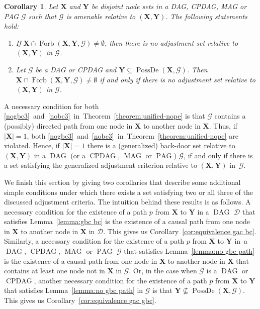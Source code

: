 \documentclass[11pt,a4paper]{article}
\newtheorem{corollary}[definition]{Corollary}
\DeclareMathOperator{\CPDAG}{CPDAG}
\DeclareMathOperator{\DAG}{DAG}
\DeclareMathOperator{\MAG}{MAG}
\DeclareMathOperator{\PAG}{PAG}
\DeclareMathOperator{\PossDe}{PossDe}
\DeclareMathOperator{\Forbi}{Forb}
\newcommand{\g}[1][G]{\mathcal{#1}}
\newcommand{\fb}[2][X,Y]{\Forbi(\mathbf{#1},#2)}%
\begin{document}
\begin{corollary}
Let $\mathbf{X}$ and $\mathbf{Y}$ be disjoint node sets in a DAG, CPDAG, MAG or PAG $\g$ such that $\g$ is amenable relative to $(\mathbf{X,Y})$. The following statements hold:
\begin{enumerate}[label=(\roman*)]
\item\label{noforbx1}  If $\mathbf{X} \cap \fb{\g} \neq \emptyset$, then there is no adjustment set relative to $(\mathbf{X,Y})$ in $\g$.
\item\label{noforbx2} Let $\g$ be a DAG or CPDAG and $\mathbf{Y} \subseteq \PossDe(\mathbf{X},\g)$. Then $\mathbf{X} \cap \fb{\g} \neq \emptyset$ if and only if there is no adjustment set relative to $(\mathbf{X,Y})$ in $\g$.
\end{enumerate}
\label{cor:noforbx}
\end{corollary}


\noindent{}A necessary condition for both \ref{nogbc3}~and~\ref{nobc3}~in~Theorem~\ref{theorem:unified-nope} is that $\g$ contains a (possibly) directed path from one node in $\mathbf{X}$ to another node in $\mathbf{X}$. Thus, if $|\mathbf{X}|=1$, both \ref{nogbc3}~and~\ref{nobc3}~in~Theorem~\ref{theorem:unified-nope} are violated. Hence, if $|\mathbf{X}|=1$ there is a (generalized) back-door set relative to $(\mathbf{X,Y})$ in a $\DAG$ (or a $\CPDAG$, $\MAG$ or $\PAG$) $\g$, if and only if there is a set satisfying the generalized adjustment criterion relative to $(\mathbf{X,Y})$ in~$\g$.

We finish this section by giving two corollaries that describe some additional simple conditions under which there exists a set satisfying two or all three of the discussed adjustment criteria. The intuition behind these results is as follows. A necessary condition for the existence of a path $p$ from $\mathbf{X}$ to $\mathbf{Y}$ in a $\DAG$ $\g[D]$ that satisfies Lemma~\ref{lemma:gbc bc} is the existence of a causal path from one node in $\mathbf{X}$ to another node in $\mathbf{X}$ in $\g[D]$. This gives us Corollary~\ref{cor:equivalence gac bc}. Similarly, a necessary condition for the existence of a path $p$ from $\mathbf{X}$ to $\mathbf{Y}$ in~a $\DAG$, $\CPDAG$, $\MAG$ or $\PAG$ $\g$ that satisfies Lemma~\ref{lemma:no gbc path} is the existence of a causal path from one node in $\mathbf{X}$ to another node in $\mathbf{X}$ that contains at least one node not in $\mathbf{X}$ in $\g$. Or, in the case when $\g$ is a $\DAG$ or $\CPDAG$, another necessary condition for the existence of a path $p$ from $\mathbf{X}$ to $\mathbf{Y}$ that satisfies Lemma~\ref{lemma:no gbc path} in $\g$ is that $\mathbf{Y} \not\subseteq \PossDe(\mathbf{X},\g)$. This gives us Corollary~\ref{cor:equivalence gac gbc}.
\end{document}
